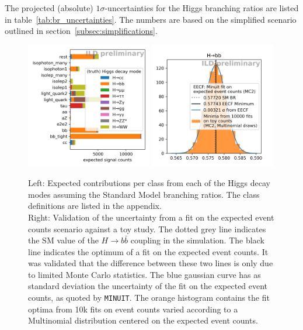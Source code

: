 \documentclass[11pt, hidelinks, a4paper]{scrartcl}
\begin{document}
The projected (absolute) $1 \sigma$-uncertainties for the Higgs branching ratios
are listed in table~\ref{tab:br_uncertainties}.
The numbers are based on the simplified scenario
outlined in section~\ref{subsec:simplifications}.

\begin{figure}[ht]
    \centering
    \includegraphics[width=0.49\textwidth, keepaspectratio]{intro_category_counts}
    \includegraphics[width=0.49\textwidth, keepaspectratio]{H_bb}
    \caption{
        Left: Expected contributions per class from each of the Higgs decay modes
        assuming the Standard Model branching ratios.
        The class definitions are listed in the appendix.
        \\
        Right: Validation of the uncertainty from
        a fit on the expected event counts scenario against a toy study.
        The dotted grey line indicates the SM value of
        the $H \to b \bar{b}$ coupling in the simulation.
        The black line indicates the optimum of a fit on
        the expected event counts.
        It was validated that the difference between these two lines
        is only due to limited Monte Carlo statistics.
        The blue gaussian curve has as standard deviation the uncertainty of
        the fit on the expected event counts, as quoted by \texttt{MINUIT}.
        The orange histogram contains the fit optima from
        10k fits on event counts varied according to
        a Multinomial distribution centered on the expected event counts.
    }\label{fig:toys}
\end{figure}
\end{document}
